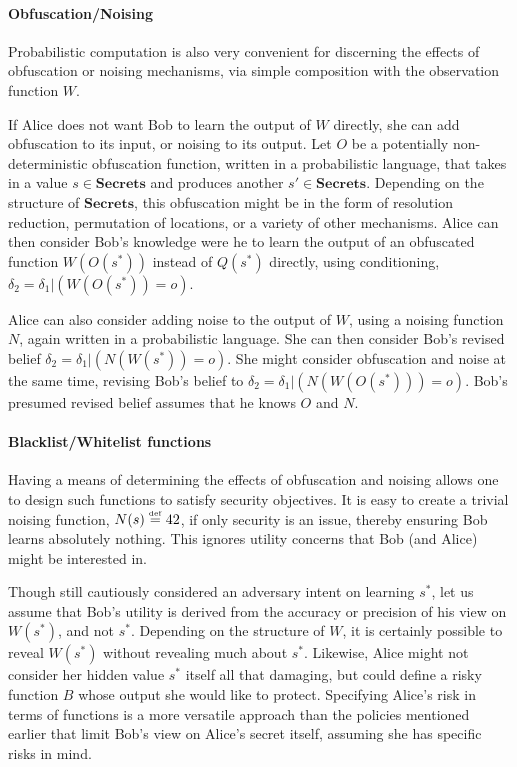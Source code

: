\documentclass{article} %
\newcommand{\secrets}[0]{\textbf{Secrets}}
\newcommand{\asecret}[0]{s}
\newcommand{\rsecret}[0]{\asecret^*}
\newcommand{\paren}[1]{\left( #1 \right)}
\newcommand{\cond}[0]{|}
\newcommand{\stacklabel}[1]{\stackrel{\smash{\scriptscriptstyle \mathrm{#1}}}}
\newcommand{\defeq}{\stacklabel{def}=}
\theoremstyle{plain} %
\theoremstyle{definition} %
\begin{document}
\paragraph*{Obfuscation/Noising} Probabilistic computation is also very
convenient for discerning the effects of obfuscation or noising
mechanisms, via simple composition with the observation function $ W
$.

If Alice does not want Bob to learn the output of $ W $ directly, she
can add obfuscation to its input, or noising to its output. Let $ O $
be a potentially non-deterministic obfuscation function, written in a
probabilistic language, that takes in a value $ \asecret \in \secrets
$ and produces another $ \asecret' \in \secrets $. Depending on the
structure of $ \secrets $, this obfuscation might be in the form of
resolution reduction, permutation of locations, or a variety of other
mechanisms. Alice can then consider Bob's knowledge were he to learn
the output of an obfuscated function $ W(O(\rsecret)) $ instead of $
Q(\rsecret) $ directly, using conditioning, $ \delta_2 = \delta_1
\cond \paren{W(O(\rsecret)) = o} $.

Alice can also consider adding noise to the output of $ W $, using a
noising function $ N $, again written in a probabilistic language. She
can then consider Bob's revised belief $ \delta_2 = \delta_1 \cond
\paren{N(W(\rsecret)) = o} $. She might consider obfuscation and noise
at the same time, revising Bob's belief to $ \delta_2 = \delta_1 \cond
\paren{N(W(O(\rsecret))) = o} $. Bob's presumed revised belief assumes
that he knows $ O $ and $ N $.

\paragraph*{Blacklist/Whitelist functions} Having a means of
determining the effects of obfuscation and noising allows one to
design such functions to satisfy security objectives. It is easy to
create a trivial noising function, $ N(\asecret) \defeq 42 $, if only
security is an issue, thereby ensuring Bob learns absolutely
nothing. This ignores utility concerns that Bob (and Alice) might be
interested in.

Though still cautiously considered an adversary intent on learning $
\rsecret $, let us assume that Bob's utility is derived from the
accuracy or precision of his view on $ W(\rsecret) $, and not $
\rsecret $. Depending on the structure of $ W $, it is certainly
possible to reveal $ W(\rsecret) $ without revealing much about $
\rsecret $.  Likewise, Alice might not consider her hidden value $ \rsecret $
itself all that damaging, but could define a risky function $ B $
whose output she would like to protect. Specifying Alice's risk in
terms of functions is a more versatile approach than the policies
mentioned earlier that limit Bob's view on Alice's secret itself,
assuming she has specific risks in mind.
\end{document}
